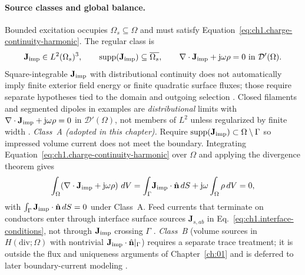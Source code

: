 \paragraph{Source classes and global balance.}
Bounded excitation occupies $\Omega_s\subseteq\Omega$ and must satisfy Equation~\eqref{eq:ch1.charge-continuity-harmonic}. The regular class is
\begin{equation}
\label{eq:ch1.source-charge-continuous}
\mathbf{J}_{\mathrm{imp}}\in L^2(\Omega_s)^3,\qquad
\operatorname{supp}(\mathbf{J}_{\mathrm{imp}})\subseteq\overline{\Omega_s},\qquad
\nabla\cdot\mathbf{J}_{\mathrm{imp}}+\mathrm{j}\omega\rho=0
\ \text{in }\mathcal{D}'(\Omega).
\end{equation}
Square-integrable $\mathbf{J}_{\mathrm{imp}}$ with distributional continuity does not automatically imply finite exterior field energy or finite quadratic surface fluxes; those require separate hypotheses tied to the domain and outgoing selection \cite{stratton1941}. Closed filaments and segmented dipoles in examples are \emph{distributional} limits with $\nabla\cdot\mathbf{J}_{\mathrm{imp}}+\mathrm{j}\omega\rho=0$ in $\mathcal{D}'(\Omega)$, not members of $L^2$ unless regularized by finite width \cite{stratton1941,jackson1999}. \emph{Class~A (adopted in this chapter).} Require $\operatorname{supp}(\mathbf{J}_{\mathrm{imp}})\subset\Omega\setminus\Gamma$ so impressed volume current does not meet the boundary. Integrating Equation~\eqref{eq:ch1.charge-continuity-harmonic} over $\Omega$ and applying the divergence theorem gives
\begin{equation}
\label{eq:ch1.global-charge-compatibility}
\int_{\Omega}\!\left(\nabla\cdot\mathbf{J}_{\mathrm{imp}}+\mathrm{j}\omega\rho\right)\,dV
=\int_{\Gamma}\!\mathbf{J}_{\mathrm{imp}}\cdot\hat{\mathbf{n}}\,dS+\mathrm{j}\omega\int_{\Omega}\rho\,dV=0,
\end{equation}
with $\int_{\Gamma}\mathbf{J}_{\mathrm{imp}}\cdot\hat{\mathbf{n}}\,dS=0$ under Class~A. Feed currents that terminate on conductors enter through interface surface sources $\mathbf{J}_{s,ab}$ in Eq.~\eqref{eq:ch1.interface-conditions}, not through $\mathbf{J}_{\mathrm{imp}}$ crossing $\Gamma$ \cite{stratton1941,harrington2001}. \emph{Class~B} (volume sources in $H(\mathrm{div};\Omega)$ with nontrivial $\mathbf{J}_{\mathrm{imp}}\cdot\hat{\mathbf{n}}|_\Gamma$) requires a separate trace treatment; it is outside the flux and uniqueness arguments of Chapter~\ref{ch:01} and is deferred to later boundary-current modeling \cite{stratton1941}.

